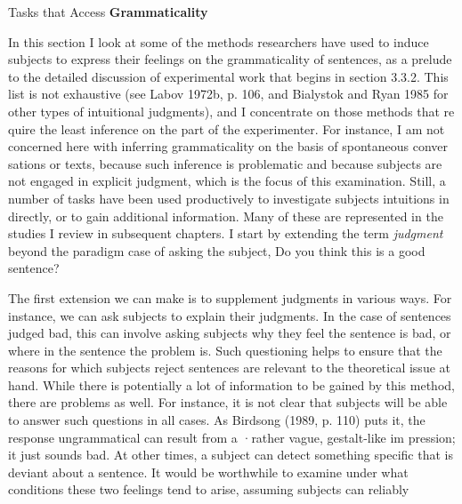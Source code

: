 \setcounter{listWWNumlvleveli}{2}
\begin{listWWNumlvleveli}
\item 
\setcounter{listWWNumlvlevelii}{1}
\begin{listWWNumlvlevelii}
\item 
\begin{styleStandard}
Tasks that Access \textbf{Grammaticality}
\end{styleStandard}


\end{listWWNumlvlevelii}
\end{listWWNumlvleveli}
\begin{styleTextbody}
In this section I look at some of the methods researchers have used to induce subjects to express their feelings on the grammaticality of sentences, as a prelude to the detailed discussion of experimental work that begins in section 3.3.2. This list is not exhaustive (see Labov 1972b, p. 106, and Bialystok and Ryan 1985 for other types of intuitional judgments), and I concentrate on those methods that re\- quire the least inference on the part of the experimenter. For instance, I am not concerned here with inferring grammaticality on the basis of spontaneous conver\- sations or texts, because such inference is problematic and because subjects are not engaged in explicit judgment, which is the focus of this examination.{\textquotesingle} Still, a number of tasks have been used productively to investigate subjects{\textquotesingle} intuitions in\- directly, or to gain additional information. Many of these are represented in the studies I review in subsequent chapters. I start by extending the term \textit{judgment }beyond the paradigm case of asking the subject, {\textquotedbl}Do you think this is a good sentence?{\textquotedbl}
\end{styleTextbody}


\begin{styleTextbody}
The first extension we can make is to supplement judgments in various ways. For instance, we can ask subjects to explain their judgments. In the case of sentences judged bad, this can involve asking subjects why they feel the sentence is bad, or where in the sentence the problem is. Such questioning helps to ensure that the reasons for which subjects reject sentences are relevant to the theoretical issue at hand. While there is potentially a lot of information to be gained by this method, there are problems as well. For instance, it is not clear that subjects will be able to answer such questions in all cases. As Birdsong (1989, p. 110) puts it, the response {\textquotedbl}ungrammatical{\textquotedbl} can result from a ·{\textquotesingle}rather vague, gestalt-like im\- pression{\textquotedbl}; it just sounds bad. At other times, a subject can detect something specific that is deviant about a sentence. It would be worthwhile to examine under what conditions these two feelings tend to arise, assuming subjects can reliably
\end{styleTextbody}


